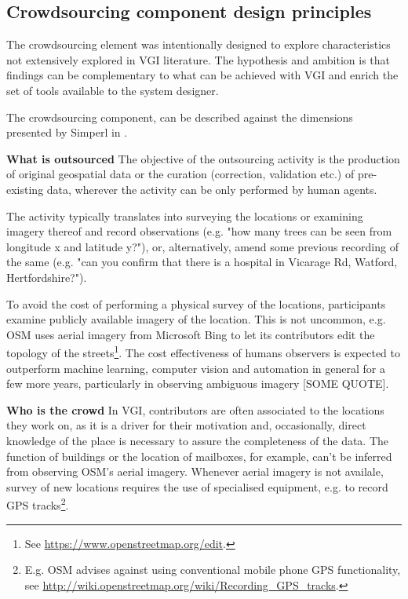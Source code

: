 \subsection{Crowdsourcing component design principles}

The crowdsourcing element was intentionally designed to explore characteristics not extensively explored in VGI literature. The hypothesis and ambition is that findings can be complementary to what can be achieved with VGI and enrich the set of tools available to the system designer.

The crowdsourcing component, can be described against the dimensions presented by Simperl in \cite{Wearethedata:2015uo}. 

\textbf{What is outsourced} The objective of the outsourcing activity is the production of original geospatial data or the curation (correction, validation etc.) of pre-existing data, wherever the activity can be only performed by human agents. 

The activity typically translates into surveying the locations or examining imagery thereof and record observations (e.g. "how many trees can be seen from longitude x and latitude y?"), or, alternatively, amend some previous recording of the same (e.g. "can you confirm that there is a hospital in Vicarage Rd, Watford, Hertfordshire?"). 

To avoid the cost of performing a physical survey of the locations, participants examine publicly available imagery of the location. This is not uncommon, e.g. OSM uses aerial imagery from Microsoft Bing to let its contributors edit the topology of the streets\footnote{See \url{https://www.openstreetmap.org/edit}.}. The cost effectiveness of humans observers is expected to outperform machine learning, computer vision and automation in general for a few more years, particularly in observing ambiguous imagery [SOME QUOTE].

\textbf{Who is the crowd} In VGI, contributors are often associated to the locations they work on, as it is a driver for their motivation and, occasionally, direct knowledge of the place is necessary to assure the completeness of the data. The function of buildings or the location of mailboxes, for example, can't be inferred from observing OSM's aerial imagery. Whenever aerial imagery is not availale, survey of new locations requires the use of specialised equipment, e.g. to record GPS tracks\footnote{E.g. OSM advises against using conventional mobile phone GPS functionality, see \url{http://wiki.openstreetmap.org/wiki/Recording_GPS_tracks}.}.

